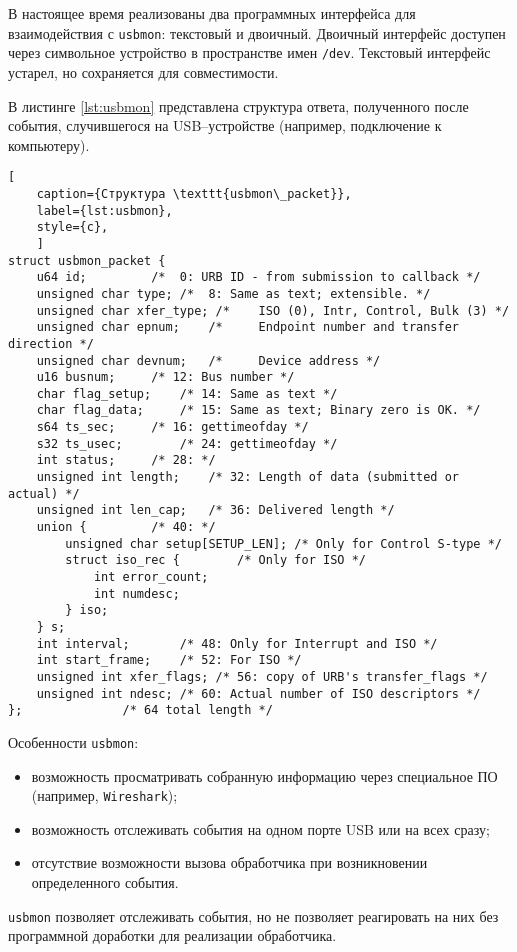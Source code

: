 В настоящее время реализованы два программных интерфейса для взаимодействия с \texttt{usbmon}: текстовый и двоичный. Двоичный интерфейс доступен через символьное устройство в пространстве имен \texttt{/dev}. Текстовый интерфейс устарел, но сохраняется для совместимости.

В листинге \ref{lst:usbmon} представлена структура ответа, полученного после события, случившегося на USB--устройстве (например, подключение к компьютеру).

\begin{lstlisting}[
	caption={Структура \texttt{usbmon\_packet}},
	label={lst:usbmon},
	style={c},
	]
struct usbmon_packet {
	u64 id;			/*  0: URB ID - from submission to callback */
	unsigned char type;	/*  8: Same as text; extensible. */
	unsigned char xfer_type; /*    ISO (0), Intr, Control, Bulk (3) */
	unsigned char epnum;	/*     Endpoint number and transfer direction */
	unsigned char devnum;	/*     Device address */
	u16 busnum;		/* 12: Bus number */
	char flag_setup;	/* 14: Same as text */
	char flag_data;		/* 15: Same as text; Binary zero is OK. */
	s64 ts_sec;		/* 16: gettimeofday */
	s32 ts_usec;		/* 24: gettimeofday */
	int status;		/* 28: */
	unsigned int length;	/* 32: Length of data (submitted or actual) */
	unsigned int len_cap;	/* 36: Delivered length */
	union {			/* 40: */
		unsigned char setup[SETUP_LEN];	/* Only for Control S-type */
		struct iso_rec {		/* Only for ISO */
			int error_count;
			int numdesc;
		} iso;
	} s;
	int interval;		/* 48: Only for Interrupt and ISO */
	int start_frame;	/* 52: For ISO */
	unsigned int xfer_flags; /* 56: copy of URB's transfer_flags */
	unsigned int ndesc;	/* 60: Actual number of ISO descriptors */
};				/* 64 total length */
\end{lstlisting}

Особенности \texttt{usbmon}:

\begin{itemize}
	\item возможность просматривать собранную информацию через специальное ПО (например, \texttt{Wireshark});
	\item возможность отслеживать события на одном порте USB или на всех сразу;
	\item отсутствие возможности вызова обработчика при возникновении определенного события.
\end{itemize}

\texttt{usbmon} позволяет отслеживать события, но не позволяет реагировать на них без программной доработки для реализации обработчика.

